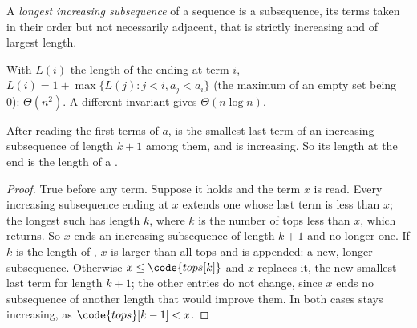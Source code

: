 \begin{definition}\label{def:b1:dynamic-programming:lis}
A \emph{longest increasing subsequence} of a sequence is a subsequence, its terms
taken in their order but not necessarily adjacent, that is strictly increasing and of largest length.
\end{definition}

With $L(i)$ the length of the  ending at term $i$, $L(i) = 1 + \max\{L(j) : j < i, a_j <
a_i\}$ (the maximum of an empty set being 0): $\Theta(n^2)$. A different invariant gives $\Theta(n \log n)$.

\label{lst:b1:dynamic-programming:lis}

\begin{proposition}\label{prop:b1:dynamic-programming:patience}
After reading the first terms of $a$,  is the smallest last term of an increasing subsequence of length
$k + 1$ among them, and  is increasing. So its length at the end is the length of a .
\end{proposition}

\begin{proof}
True before any term. Suppose it holds and the term $x$ is read. Every increasing subsequence ending at $x$ extends one
whose last term is less than $x$; the longest such has length $k$, where $k$ is the number of tops less than $x$, which
 returns. So $x$ ends an increasing subsequence of length $k + 1$ and no longer one. If $k$ is the
length of , $x$ is larger than all tops and is appended: a new, longer subsequence. Otherwise $x \leq
\code{tops[k]}$ and $x$ replaces it, the new smallest last term for length $k + 1$; the other entries do not change,
since $x$ ends no subsequence of another length that would improve them. In both cases  stays increasing, as
$\code{tops}[k - 1] < x$.
\end{proof}

\label{out:b1:dynamic-programming:lis}

